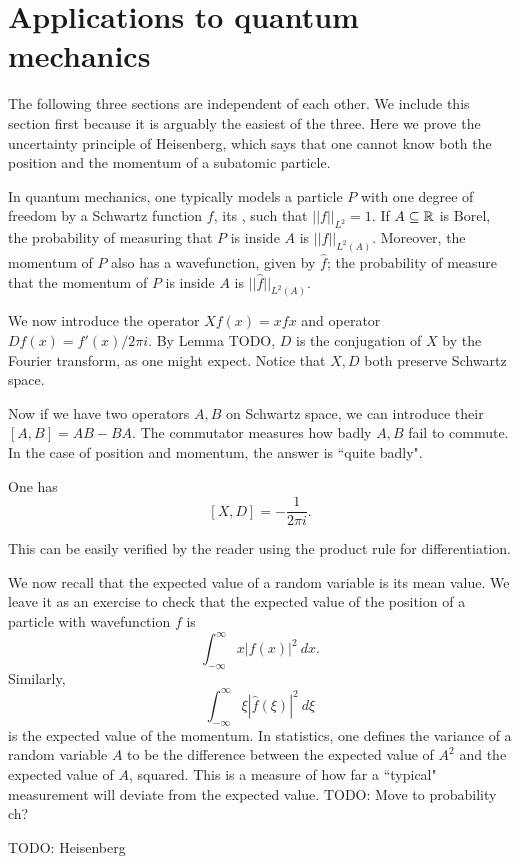 \section{Applications to quantum mechanics}
The following three sections are independent of each other. We include this section first because it is arguably the easiest of the three.
Here we prove the uncertainty principle of Heisenberg, which says that one cannot know both the position and the momentum of a subatomic particle.

In quantum mechanics, one typically models a particle $P$ with one degree of freedom by a Schwartz function $f$, its , such that $||f||_{L^2} = 1$.
If $A \subseteq \mathbb{R}$ is Borel, the probability of measuring that $P$ is inside $A$ is $||f||_{L^2(A)}$.
Moreover, the momentum of $P$ also has a wavefunction, given by $\hat f$; the probability of measure that the momentum of $P$ is inside $A$ is $||\hat f||_{L^2(A)}$.

We now introduce the  operator $Xf(x) = xfx$ and  operator $Df(x) = f'(x)/2\pi i$. By Lemma TODO, $D$ is the conjugation of $X$ by the Fourier transform, as one might expect. Notice that $X,D$ both preserve Schwartz space.

Now if we have two operators $A,B$ on Schwartz space, we can introduce their  $[A,B] = AB - BA$. The commutator measures how badly $A,B$ fail to commute.
In the case of position and momentum, the answer is ``quite badly".

\begin{theorem}
One has
\[[X, D] = -\frac{1}{2\pi i}.\]
\end{theorem}
This can be easily verified by the reader using the product rule for differentiation.

We now recall that the expected value of a random variable is its mean value. We leave it as an exercise to check that the expected value of the position of a particle with wavefunction $f$ is
\[\int_{-\infty}^{\infty} x|f(x)|^2~dx.\]
Similarly,
\[\int_{-\infty}^{\infty} \xi|\hat f(\xi)|^2~d\xi\]
is the expected value of the momentum.
In statistics, one defines the variance of a random variable $A$ to be the difference between the expected value of $A^2$ and the expected value of $A$, squared.
This is a measure of how far a ``typical" measurement will deviate from the expected value.
TODO: Move to probability ch?

TODO: Heisenberg

